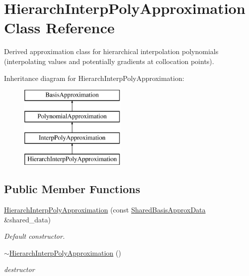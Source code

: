 \section{Hierarch\+Interp\+Poly\+Approximation Class Reference}
\label{classPecos_1_1HierarchInterpPolyApproximation}


Derived approximation class for hierarchical interpolation polynomials (interpolating values and potentially gradients at collocation points).  


Inheritance diagram for Hierarch\+Interp\+Poly\+Approximation\+:\begin{figure}[H]
\begin{center}
\leavevmode
\includegraphics[height=4.000000cm]{classPecos_1_1HierarchInterpPolyApproximation}
\end{center}
\end{figure}
\subsection*{Public Member Functions}
\begin{DoxyCompactItemize}
\item 
\hyperlink{classPecos_1_1HierarchInterpPolyApproximation_a7a8667f6bece197e5c58ffa0a65bbbf0}{Hierarch\+Interp\+Poly\+Approximation} (const \hyperlink{classPecos_1_1SharedBasisApproxData}{Shared\+Basis\+Approx\+Data} \&shared\+\_\+data)\label{classPecos_1_1HierarchInterpPolyApproximation_a7a8667f6bece197e5c58ffa0a65bbbf0}

\begin{DoxyCompactList}\small\item\em Default constructor. \end{DoxyCompactList}\item 
\hyperlink{classPecos_1_1HierarchInterpPolyApproximation_a8a74e4730090c782a9d0973a02f003ea}{$\sim$\+Hierarch\+Interp\+Poly\+Approximation} ()\label{classPecos_1_1HierarchInterpPolyApproximation_a8a74e4730090c782a9d0973a02f003ea}

\begin{DoxyCompactList}\small\item\em destructor \end{DoxyCompactList}\end{DoxyCompactItemize}
